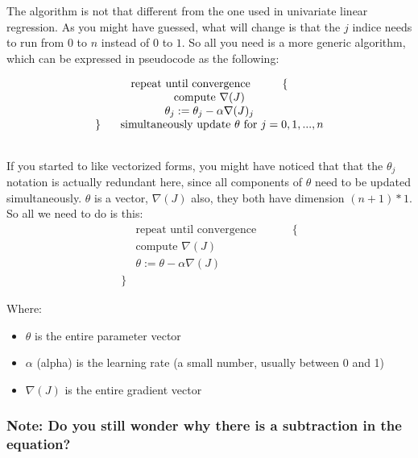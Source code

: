 \documentclass[]{article}
\begin{document}
The algorithm is not that different from the one used in univariate
linear regression. As you might have guessed, what will change is that
the \(j\) indice needs to run from \(0\) to \(n\) instead of \(0\) to
\(1\). So all you need is a more generic algorithm, which can be
expressed in pseudocode as the following:

\large

\[
\begin{matrix}
\text{repeat until convergence} \hspace{1cm}\{\\
    \text{compute } \nabla{(J)}  \\
    \theta_j := \theta_j - \alpha \nabla(J)_j  \\ 
    \} \hspace{0.5cm} \text{ simultaneously update $\theta$ for $j=0,1,...,n$}  \\ 
    \\
\end{matrix}
\] \normalsize

If you started to like vectorized forms, you might have noticed that
that the \(\theta_j\) notation is actually redundant here, since all
components of \(\theta\) need to be updated simultaneously. \(\theta\)
is a vector, \(\nabla{(J)}\) also, they both have dimension
\((n+1) * 1\). So all we need to do is this:\\
\large \[
\begin{matrix}
    &   \text{repeat until convergence} \hspace{1cm} &  \{  \\
    &   \text{compute } \nabla{(J)}  \\
    &   \theta := \theta - \alpha \nabla(J)                 \\ 
\} 
\end{matrix}
\] \normalsize

Where:

\begin{itemize}
\item
  \(\theta\) is the entire parameter vector
\item
  \(\alpha\) (alpha) is the learning rate (a small number, usually
  between 0 and 1)
\item
  \(\nabla{(J)}\) is the entire gradient vector
\end{itemize}

\hypertarget{note-do-you-still-wonder-why-there-is-a-subtraction-in-the-equation}{%
\subsubsection{Note: Do you still wonder why there is a subtraction in
the
equation?}\label{note-do-you-still-wonder-why-there-is-a-subtraction-in-the-equation}}
\end{document}
